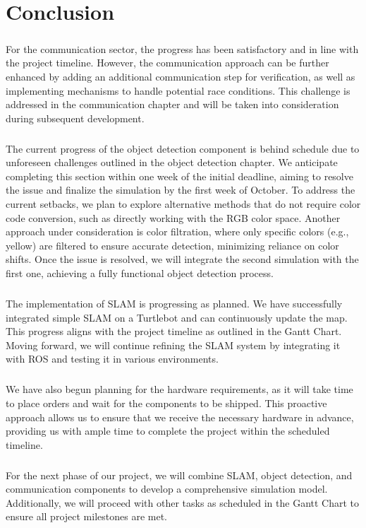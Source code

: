 \chapter{Conclusion}

\paragraph*{}
For the communication sector, the progress has been satisfactory and in line with the project timeline. However, the communication approach can be further enhanced by adding an additional communication step for verification, as well as implementing mechanisms to handle potential race conditions. This challenge is addressed in the communication chapter and will be taken into consideration during subsequent development.

\paragraph*{}
The current progress of the object detection component is behind schedule due to unforeseen challenges outlined in the object detection chapter. We anticipate completing this section within one week of the initial deadline, aiming to resolve the issue and finalize the simulation by the first week of October. To address the current setbacks, we plan to explore alternative methods that do not require color code conversion, such as directly working with the RGB color space. Another approach under consideration is color filtration, where only specific colors (e.g., yellow) are filtered to ensure accurate detection, minimizing reliance on color shifts. Once the issue is resolved, we will integrate the second simulation with the first one, achieving a fully functional object detection process.

\paragraph*{}
The implementation of SLAM is progressing as planned. We have successfully integrated simple SLAM on a Turtlebot and can continuously update the map. This progress aligns with the project timeline as outlined in the Gantt Chart. Moving forward, we will continue refining the SLAM system by integrating it with ROS and testing it in various environments.

\paragraph*{}
We have also begun planning for the hardware requirements, as it will take time to place orders and wait for the components to be shipped. This proactive approach allows us to ensure that we receive the necessary hardware in advance, providing us with ample time to complete the project within the scheduled timeline.

\paragraph*{}
For the next phase of our project, we will combine SLAM, object detection, and communication components to develop a comprehensive simulation model. Additionally, we will proceed with other tasks as scheduled in the Gantt Chart to ensure all project milestones are met.

